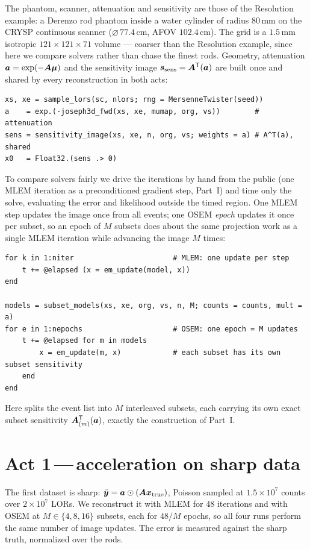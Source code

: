 \documentclass[11pt,a4paper]{article}
\begin{document}
The phantom, scanner, attenuation and sensitivity are those of the Resolution
example: a Derenzo rod phantom inside a water cylinder of radius $80\,\mathrm{mm}$
on the CRYSP continuous scanner ($\varnothing\,77.4\,\mathrm{cm}$, AFOV
$102.4\,\mathrm{cm}$). The grid is a $1.5\,\mathrm{mm}$ isotropic
$121\times121\times71$ volume --- coarser than the Resolution example, since here
we compare solvers rather than chase the finest rods. Geometry, attenuation
$\bm{a}=\exp(-\bm{A}\bm\mu)$ and the sensitivity image $\bm{s}_{\mathrm{sens}}=\bm{A}^{\mathsf{T}}(\bm{a})$ are built
once and shared by every reconstruction in both acts:
\begin{lstlisting}
xs, xe = sample_lors(sc, nlors; rng = MersenneTwister(seed))
a    = exp.(-joseph3d_fwd(xs, xe, mumap, org, vs))        # attenuation
sens = sensitivity_image(xs, xe, n, org, vs; weights = a) # A^T(a), shared
x0   = Float32.(sens .> 0)
\end{lstlisting}

To compare solvers fairly we drive the iterations by hand from the public
 (one MLEM iteration as a preconditioned gradient step, Part~I)
and time only the solve, evaluating the error and likelihood outside the timed
region. One MLEM step updates the image once from all events; one OSEM
\emph{epoch} updates it once per subset, so an epoch of $M$ subsets does about the
same projection work as a single MLEM iteration while advancing the image $M$
times:
\begin{lstlisting}
for k in 1:niter                       # MLEM: one update per step
    t += @elapsed (x = em_update(model, x))
end

models = subset_models(xs, xe, org, vs, n, M; counts = counts, mult = a)
for e in 1:nepochs                     # OSEM: one epoch = M updates
    t += @elapsed for m in models
        x = em_update(m, x)            # each subset has its own subset sensitivity
    end
end
\end{lstlisting}
Here  splits the event list into $M$ interleaved subsets,
each carrying its own exact subset sensitivity $\bm{A}^{\mathsf{T}}_{(m)}(\bm{a})$, exactly the
construction of Part~I.

\section{Act 1\,---\,acceleration on sharp data}
\label{sec:ex-osem:act1}

The first dataset is sharp: $\bar{\bm{y}}=\bm{a}\odot(\bm{A}\bm{x}_{\mathrm{true}})$, Poisson
sampled at $1.5\times10^{7}$ counts over $2\times10^{7}$ LORs. We reconstruct it
with MLEM for $48$ iterations and with OSEM at $M\in\{4,8,16\}$ subsets, each for
$48/M$ epochs, so all four runs perform the same number of image updates. The
error is measured against the sharp truth, normalized over the rods.
\end{document}

